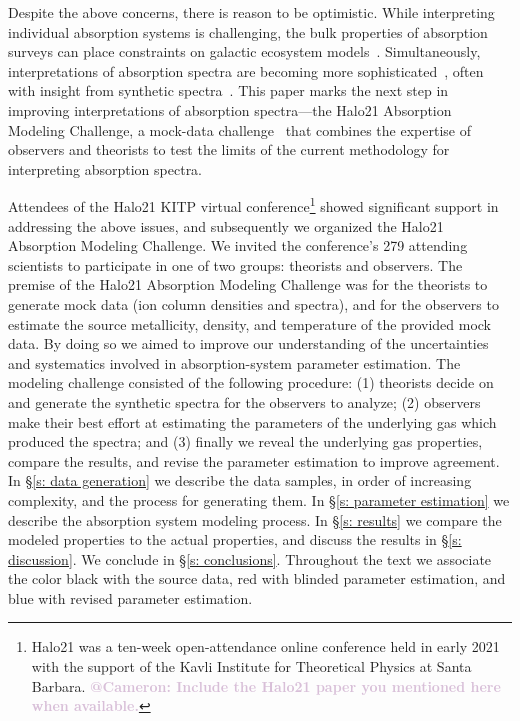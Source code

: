 \documentclass[fleqn,usenatbib]{mnras}
\makeatletter
\newcommand{\atcameron}[1]{\textcolor{Thistle}{\textbf{@Cameron: #1}}}
\makeatother
\begin{document}
Despite the above concerns, there is reason to be optimistic.
While interpreting individual absorption systems is challenging, the bulk properties of absorption surveys can place constraints on galactic ecosystem models~\citep[e.g.][]{sorini2018Fundamental, lan2018Circumgalactic}.
Simultaneously, interpretations of absorption spectra are becoming more sophisticated~\citep[e.g.][]{churchill2015Direct, sameer2021Cloudbycloud}, often with insight from synthetic spectra~\citep[e.g.][]{hummels2013Constraints, liang2018Observing}.
This paper marks the next step in improving interpretations of absorption spectra---the Halo21 Absorption Modeling Challenge, a mock-data challenge~\citep[e.g.][]{regimbau2012Mock, meacher2015Mock, hazboun2019Second} that combines the expertise of observers and theorists to test the limits of the current methodology for interpreting absorption spectra.

Attendees of the Halo21 KITP virtual conference\footnote{Halo21 was a ten-week open-attendance online conference held in early 2021 with the support of the Kavli Institute for Theoretical Physics at Santa Barbara. \atcameron{Include the Halo21 paper you mentioned here when available.}}
showed significant support in addressing the above issues, and subsequently we organized the Halo21 Absorption Modeling Challenge.
We invited the conference's 279 attending scientists to participate in one of two groups:
theorists and observers.
The premise of the Halo21 Absorption Modeling Challenge was for the theorists to generate mock data (ion column densities and spectra), and for the observers to estimate the source metallicity, density, and temperature of the provided mock data.
By doing so we aimed to improve our understanding of the uncertainties and systematics involved in absorption-system parameter estimation.
The modeling challenge consisted of the following procedure:
(1) theorists decide on and generate the synthetic spectra for the observers to analyze; (2) observers make their best effort at estimating the parameters of the underlying gas which produced the spectra; and (3) finally we reveal the underlying gas properties, compare the results, and revise the parameter estimation to improve agreement.
In \S\ref{s: data generation} we describe the data samples, in order of increasing complexity, and the process for generating them.
In \S\ref{s:  parameter estimation} we describe the absorption system modeling process.
In \S\ref{s: results} we compare the modeled properties to the actual properties, and discuss the results in \S\ref{s: discussion}.
We conclude in \S\ref{s: conclusions}.
Throughout the text we associate the color black with the source data,
red with blinded parameter estimation,
and blue with revised parameter estimation.
\end{document}
